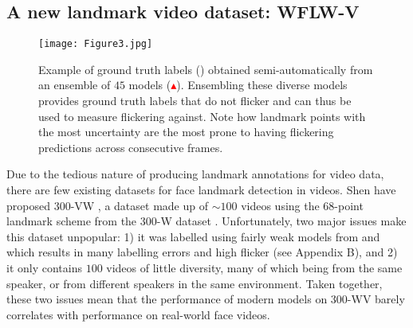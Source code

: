 \documentclass[10pt,twocolumn,letterpaper]{article}
\begin{document}
\subsection{A new landmark video dataset: WFLW-V}


\begin{figure*}[ht!]
  \centering
   \texttt{[image: Figure3.jpg]}
   \caption{Example of ground truth labels (\textcolor{green}{\textbullet}) obtained semi-automatically from an ensemble of $45$ models (\textcolor{red}{$\blacktriangle$}). Ensembling these diverse models provides ground truth labels that do not flicker and can thus be used to measure flickering against. Note how landmark points with the most uncertainty are the most prone to having flickering predictions across consecutive frames.}
   \label{fig:examples of labelled videos}
\end{figure*}

Due to the tedious nature of producing landmark annotations for video data, there are few existing datasets for face landmark detection in videos. Shen \etal have proposed 300-VW \cite{Shen2015FirstFacialLandmarkTracking}, a dataset made up of $\sim 100$ videos using the 68-point landmark scheme from the 300-W dataset \cite{Sagonas2013Dataset300W}. Unfortunately, two major issues make this dataset unpopular: 1) it was labelled using fairly weak models from \cite{Chrysos2015DeformableFaceTracking} and \cite{Tzimiropoulos2015ProjectOutCascadedRegression} which results in many labelling errors and high flicker (see Appendix B), and 2) it only contains $100$ videos of little diversity, many of which being from the same speaker, or from different speakers in the same environment. Taken together, these two issues mean that the performance of modern models on 300-WV barely correlates with performance on real-world face videos.
\end{document}
